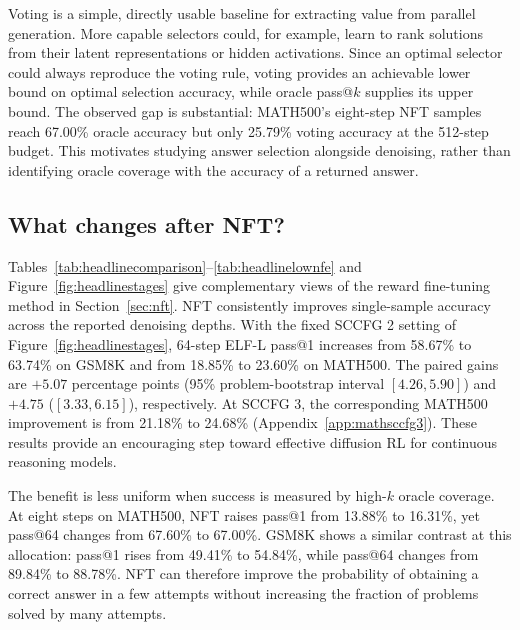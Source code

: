 Voting is a simple, directly usable baseline for extracting value from parallel generation. More capable selectors could, for example, learn to rank solutions from their latent representations or hidden activations. Since an optimal selector could always reproduce the voting rule, voting provides an achievable lower bound on optimal selection accuracy, while oracle pass@$k$ supplies its upper bound. The observed gap is substantial: MATH500's eight-step NFT samples reach 67.00\% oracle accuracy but only 25.79\% voting accuracy at the 512-step budget. This motivates studying answer selection alongside denoising, rather than identifying oracle coverage with the accuracy of a returned answer.

\subsection{What changes after NFT?}
\label{sec:nftresults}
Tables~\ref{tab:headlinecomparison}--\ref{tab:headlinelownfe} and Figure~\ref{fig:headlinestages} give complementary views of the reward fine-tuning method in Section~\ref{sec:nft}. NFT consistently improves single-sample accuracy across the reported denoising depths. With the fixed SCCFG 2 setting of Figure~\ref{fig:headlinestages}, 64-step ELF-L pass@1 increases from 58.67\% to 63.74\% on GSM8K and from 18.85\% to 23.60\% on MATH500. The paired gains are $+5.07$ percentage points (95\% problem-bootstrap interval $[4.26,5.90]$) and $+4.75$ ($[3.33,6.15]$), respectively. At SCCFG 3, the corresponding MATH500 improvement is from 21.18\% to 24.68\% (Appendix~\ref{app:mathsccfg3}). These results provide an encouraging step toward effective diffusion RL for continuous reasoning models.

The benefit is less uniform when success is measured by high-$k$ oracle coverage. At eight steps on MATH500, NFT raises pass@1 from 13.88\% to 16.31\%, yet pass@64 changes from 67.60\% to 67.00\%. GSM8K shows a similar contrast at this allocation: pass@1 rises from 49.41\% to 54.84\%, while pass@64 changes from 89.84\% to 88.78\%. NFT can therefore improve the probability of obtaining a correct answer in a few attempts without increasing the fraction of problems solved by many attempts.

